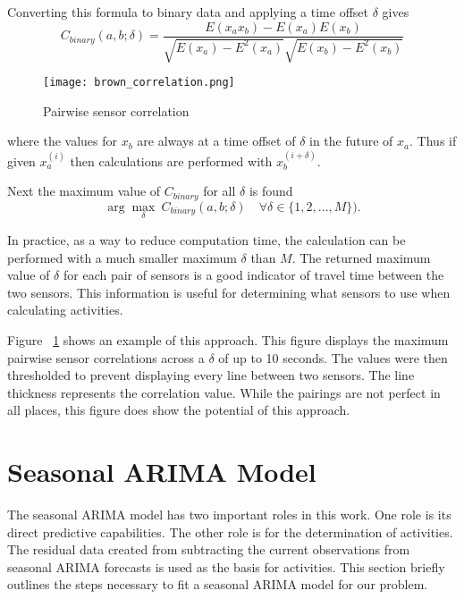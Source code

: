 Converting this formula to binary data and applying a time offset $\delta$ gives
\begin{equation}
\label{eq:correlation}
C_{binary}(a, b;\delta) = \frac{E(x_{a}x_{b}) - E(x_{a})E(x_{b})}{\sqrt{E(x_{a})-E^{2}(x_{a})}\sqrt{E(x_{b})-E^{2}(x_{b})}}
\end{equation}

\begin{figure}[t]
\begin{center}
\texttt{[image: brown\_correlation.png]}
\end{center}
\caption{Pairwise sensor correlation}
\label{fig:brown_correlation}
\end{figure}

\noindent
where the values for $x_{b}$ are always at a time offset of $\delta$ in the future of $x_{a}$.  Thus if given $x_{a}^{(i)}$ then calculations are performed with $x_{b}^{(i + \delta)}$.

Next the maximum value of $C_{binary}$ for all $\delta$ is found
\begin{equation}
\label{eq:max_correlation}
\arg\max_{\delta} \  C_{binary}(a, b;\delta) \quad \forall \delta \in \{1, 2, ..., M\}).
\end{equation}

In practice, as a way to reduce computation time, the calculation can be performed with a much smaller maximum $\delta$ than $M$.  The returned maximum value of $\delta$ for each pair of sensors is a good indicator of travel time between the two sensors.  This information is useful for determining what sensors to use when calculating activities.

Figure ~\ref{fig:brown_correlation} shows an example of this approach.  This figure displays the maximum pairwise sensor correlations across a $\delta$ of up to 10 seconds.   The values were then thresholded to prevent displaying every line between two sensors.  The line thickness represents the correlation value.  While the pairings are not perfect in all places, this figure does show the potential of this approach.  

\section{Seasonal ARIMA Model}
The seasonal ARIMA model has two important roles in this work.  One role is its direct predictive capabilities.  The other role is for the determination of activities.  The residual data created from subtracting the current observations from seasonal ARIMA forecasts is used as the basis for activities.  This section briefly outlines the steps necessary to fit a seasonal ARIMA model for our problem.  

